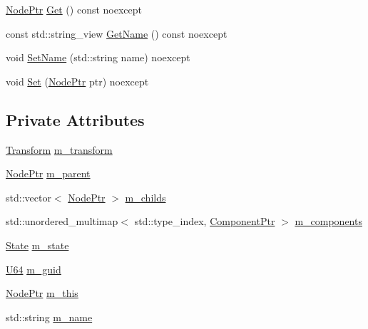 \begin{DoxyCompactItemize}
\item 
\mbox{\hyperlink{classmage_1_1_node_ac575dc006e0ae1134277ade977dc06b6}{Node\+Ptr}} \mbox{\hyperlink{classmage_1_1_node_ac317011c240a845fbdb7209e26d560f2}{Get}} () const noexcept
\item 
const std\+::string\+\_\+view \mbox{\hyperlink{classmage_1_1_node_a171831821f1f46817dd58769161bd888}{Get\+Name}} () const noexcept
\item 
void \mbox{\hyperlink{classmage_1_1_node_a7fabe953ff8ca39e7e499fc16d551965}{Set\+Name}} (std\+::string name) noexcept
\item 
void \mbox{\hyperlink{classmage_1_1_node_aabbe500cdf7842b663bfcf034de25c5a}{Set}} (\mbox{\hyperlink{classmage_1_1_node_ac575dc006e0ae1134277ade977dc06b6}{Node\+Ptr}} ptr) noexcept
\end{DoxyCompactItemize}
\subsection*{Private Attributes}
\begin{DoxyCompactItemize}
\item 
\mbox{\hyperlink{classmage_1_1_transform}{Transform}} \mbox{\hyperlink{classmage_1_1_node_a0f4dd0c46d9713fd64b0e562862afac6}{m\+\_\+transform}}
\item 
\mbox{\hyperlink{classmage_1_1_node_ac575dc006e0ae1134277ade977dc06b6}{Node\+Ptr}} \mbox{\hyperlink{classmage_1_1_node_aa04f166b52fca444c8756c0864a16cde}{m\+\_\+parent}}
\item 
std\+::vector$<$ \mbox{\hyperlink{classmage_1_1_node_ac575dc006e0ae1134277ade977dc06b6}{Node\+Ptr}} $>$ \mbox{\hyperlink{classmage_1_1_node_a1d1d432f46c61932b5167d27d20cc383}{m\+\_\+childs}}
\item 
std\+::unordered\+\_\+multimap$<$ std\+::type\+\_\+index, \mbox{\hyperlink{classmage_1_1_node_a46b7e1f4f5b98bfa78ed96a80797a4ba}{Component\+Ptr}} $>$ \mbox{\hyperlink{classmage_1_1_node_a804d53398f193b6b06f883131ab7415d}{m\+\_\+components}}
\item 
\mbox{\hyperlink{namespacemage_ae47d13d8477ee94893b9a3947d28eebc}{State}} \mbox{\hyperlink{classmage_1_1_node_a76b775e32bb001c54a9927461eaf7926}{m\+\_\+state}}
\item 
\mbox{\hyperlink{namespacemage_ae0ad2dd0035dba92ed0f2e84c182b03b}{U64}} \mbox{\hyperlink{classmage_1_1_node_a3ef1876293074bfcc01104eb92f1bfdf}{m\+\_\+guid}}
\item 
\mbox{\hyperlink{classmage_1_1_node_ac575dc006e0ae1134277ade977dc06b6}{Node\+Ptr}} \mbox{\hyperlink{classmage_1_1_node_ab056e1563dca22433efa152f4b6da46f}{m\+\_\+this}}
\item 
std\+::string \mbox{\hyperlink{classmage_1_1_node_a69cfc52bdc0572dfc776e2ff27c9eec2}{m\+\_\+name}}
\end{DoxyCompactItemize}


